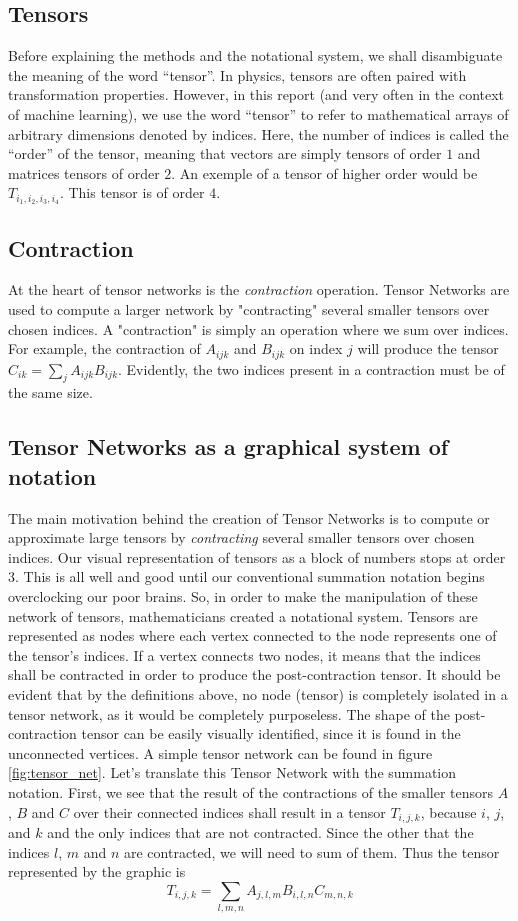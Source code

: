 \documentclass{article}
\theoremstyle{definition}
\theoremstyle{definition}
\begin{document}
\subsection{Tensors}
Before explaining the methods and the notational system, we shall disambiguate the meaning of the word \enquote{tensor}. In physics, tensors are often paired with transformation properties. 
However, in this report (and very often in the context of machine learning), we use the word \enquote{tensor} to refer to mathematical arrays of arbitrary dimensions denoted by indices. Here, the number of indices is called the \enquote{order} of the tensor, meaning that vectors are simply tensors of order $1$ and matrices tensors of order $2$. An exemple of a tensor of higher order would be $T_{i_1,i_2,i_3,i_4}$. This tensor is of order $4$.

\subsection{Contraction}
At the heart of tensor networks is the {\it contraction} operation.
Tensor Networks are used to compute a larger network by "contracting" several
smaller tensors over chosen indices. A "contraction" is simply an operation 
where we sum over indices. For example, the contraction of $A_{ijk}$ and 
$B_{ijk}$ on index $j$ will produce the tensor $C_{ik} = \sum_{j} A_{ijk} B_{ijk}$.
Evidently, the two indices present in a contraction must be of the same size.

\subsection{Tensor Networks as a graphical system of notation}
The main motivation behind the creation of Tensor Networks is to compute or approximate large tensors by {\it contracting} several smaller tensors over chosen indices. Our visual representation of tensors as a block of numbers stops at order $3$. 
This is all well and good until our conventional summation notation begins overclocking our poor brains. 
So, in order to make the manipulation of these network of tensors, mathematicians created a notational system. 
Tensors are represented as nodes where each vertex connected to the node represents one of the tensor's indices. 
If a vertex connects two nodes, it means that the indices shall be contracted in order to produce the post-contraction tensor. 
It should be evident that by the definitions above, no node (tensor) is completely isolated in a tensor network, as it would be completely purposeless. 
The shape of the post-contraction tensor can be easily visually identified, since it is found in the unconnected vertices.
A simple tensor network can be found in figure \ref{fig:tensor_net}.
Let's translate this Tensor Network with the summation notation. First, we see that the result of the contractions of the smaller tensors $A$, $B$ and $C$ over their connected indices shall result in a tensor $T_{i, j, k}$, because $i$, $j$, and $k$ and the only indices that are not contracted. Since the other that the indices $l$, $m$ and $n$ are contracted, we will need to sum of them. Thus the tensor represented by the graphic is
\[ 
    T_{i, j, k} = \sum_{l, m, n} A_{j, l, m} B_{i, l, n} C_{m, n, k}
\]
\end{document}
